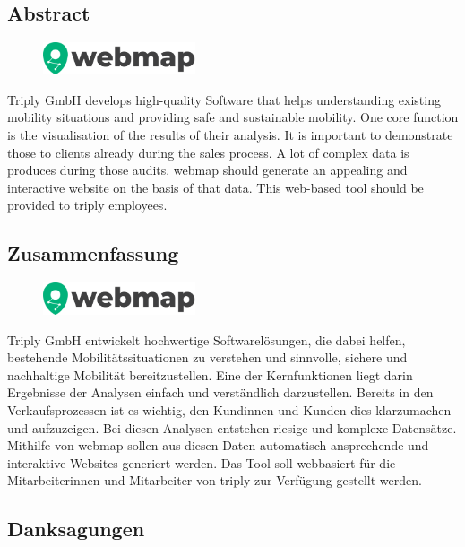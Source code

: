 \begin{spacing}{1}
    \chapter*{Abstract}
\end{spacing}
\begin{figure}
    \begin{center}
      \includegraphics[width=0.4\textwidth]{pics/webmap_logo}
    \end{center}
\end{figure}
Triply GmbH develops high-quality Software that helps understanding existing mobility situations and providing safe and sustainable mobility.
One core function is the visualisation of the results of their analysis.
It is important to demonstrate those to clients already during the sales process.
A lot of complex data is produces during those audits.
webmap should generate an appealing and interactive website on the basis of that data.
This web-based tool should be provided to triply employees.
\newpage
\begin{spacing}{1}
    \chapter*{Zusammenfassung}
\end{spacing}
\begin{figure}
    \begin{center}
      \includegraphics[width=0.4\textwidth]{pics/webmap_logo}
    \end{center}
\end{figure}
Triply GmbH entwickelt hochwertige Softwarelösungen, die dabei helfen,
bestehende Mobilitätssituationen zu verstehen und sinnvolle, sichere und
nachhaltige Mobilität bereitzustellen.
Eine der Kernfunktionen liegt darin Ergebnisse der Analysen einfach und verständlich darzustellen.
Bereits in den Verkaufsprozessen ist es wichtig, den Kundinnen und Kunden dies klarzumachen und aufzuzeigen.
Bei diesen Analysen entstehen riesige und komplexe Datensätze.
Mithilfe von webmap sollen aus diesen Daten automatisch ansprechende und interaktive Websites generiert werden.
Das Tool soll webbasiert für die Mitarbeiterinnen und Mitarbeiter von triply zur Verfügung gestellt werden.

\newpage
\begin{spacing}{1}
    \chapter{Danksagungen}
\end{spacing}
